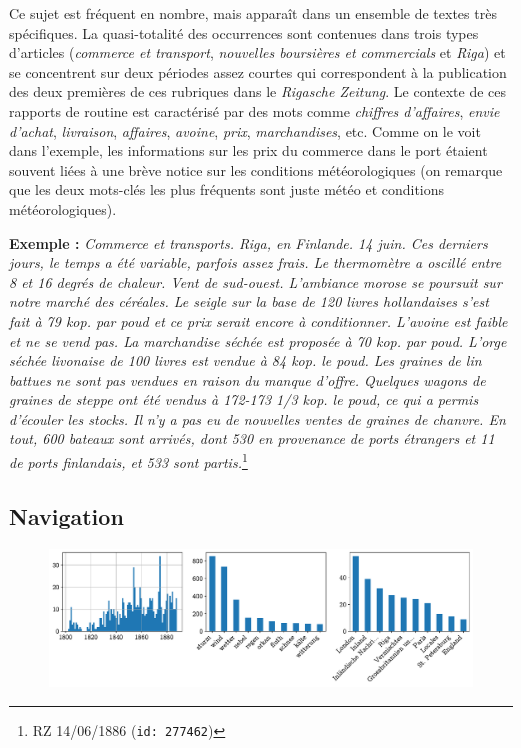 \documentclass[a4paper,twoside,12pt]{article}
\begin{document}
\noindent Ce sujet est fréquent en nombre, mais apparaît dans un ensemble de textes très spécifiques. La quasi-totalité des occurrences sont contenues dans trois types d'articles (\textit{commerce et transport}, \textit{nouvelles boursières et commercials} et \textit{Riga}) et se concentrent sur deux périodes assez courtes qui correspondent à la publication des deux premières de ces rubriques dans le \textit{Rigasche Zeitung}. Le contexte de ces rapports de routine est caractérisé par des mots comme \textit{chiffres d'affaires}, \textit{envie d'achat}, \textit{livraison}, \textit{affaires}, \textit{avoine}, \textit{prix}, \textit{marchandises}, etc. Comme on le voit dans l'exemple, les informations sur les prix du commerce dans le port étaient souvent liées à une brève notice sur les conditions météorologiques (on remarque que les deux mots-clés les plus fréquents sont juste météo et conditions météorologiques).

\medskip

\noindent \textbf{Exemple :} \textit{Commerce et transports. Riga, en Finlande. 14 juin. Ces derniers jours, le temps a été variable, parfois assez frais. Le thermomètre a oscillé entre 8 et 16 degrés de chaleur. Vent de sud-ouest. L'ambiance morose se poursuit sur notre marché des céréales. Le seigle sur la base de 120 livres hollandaises s'est fait à 79 kop. par poud et ce prix serait encore à conditionner. L'avoine est faible et ne se vend pas. La marchandise séchée est proposée à 70 kop. par poud. L'orge séchée livonaise de 100 livres est vendue à 84 kop. le poud. Les graines de lin battues ne sont pas vendues en raison du manque d'offre. Quelques wagons de graines de steppe ont été vendus à 172-173 1/3 kop. le poud, ce qui a permis d'écouler les stocks. Il n'y a pas eu de nouvelles ventes de graines de chanvre. En tout, 600 bateaux sont arrivés, dont 530 en provenance de ports étrangers et 11 de ports finlandais, et 533 sont partis.}\footnote{RZ 14/06/1886 (\texttt{id: 277462})}



\subsection{Navigation} \label{topic6_navigation}

\begin{figure}[H]
\centering
\includegraphics[width=\textwidth]{images/topic_charts_6.pdf}
\end{figure}
\end{document}
